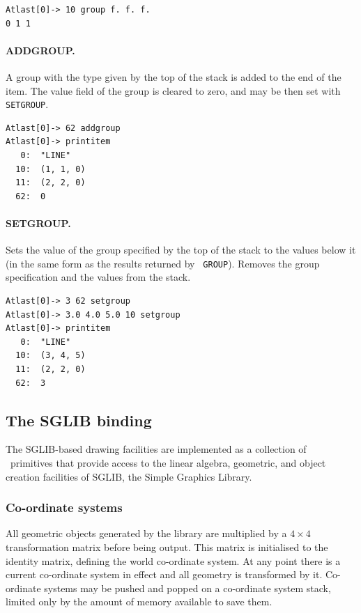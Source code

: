 \documentclass{article}
\begin{document}
\begin{verbatim}
Atlast[0]-> 10 group f. f. f.
0 1 1
\end{verbatim}

\paragraph{ADDGROUP.}
A group with the type given by the top of the stack is added to the
end of the item.  The value field of the group is cleared to zero, and
may be then set with {\tt SETGROUP}\@.

\begin{verbatim}
Atlast[0]-> 62 addgroup
Atlast[0]-> printitem
   0:  "LINE"
  10:  (1, 1, 0)
  11:  (2, 2, 0)
  62:  0
\end{verbatim}

\paragraph{SETGROUP.}
Sets the value of the group specified by the top of the stack to the
values below it (in the same form as the results returned by {\tt
GROUP}).  Removes the group specification and the values from the
stack.

\begin{verbatim}
Atlast[0]-> 3 62 setgroup
Atlast[0]-> 3.0 4.0 5.0 10 setgroup
Atlast[0]-> printitem
   0:  "LINE"
  10:  (3, 4, 5)
  11:  (2, 2, 0)
  62:  3
\end{verbatim}

\subsection{The SGLIB binding}

The SGLIB-based drawing facilities are implemented as a collection of
\atlas\ primitives that provide access to the linear algebra,
geometric, and object creation facilities of SGLIB, the Simple
Graphics Library.

\subsubsection{Co-ordinate systems}

All geometric objects generated by the library are multiplied by a
$4\times 4$ transformation matrix before being output.  This matrix is
initialised to the identity matrix, defining the world co-ordinate
system.  At any point there is a current co-ordinate system in effect
and all geometry is transformed by it.  Co-ordinate systems may be
pushed and popped on a co-ordinate system stack, limited only by the
amount of memory available to save them.
\end{document}
